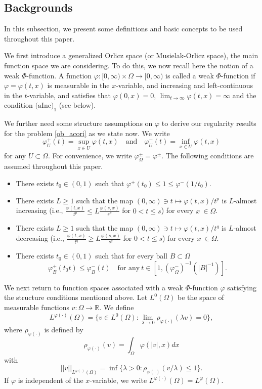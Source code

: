 \documentclass[11pt, reqno]{amsart}
\numberwithin{equation}{section}
\begin{document}
\subsection{Backgrounds}
In this subsection, we present some definitions and basic concepts to be used throughout this paper.

We first introduce a generalized Orlicz space (or Musielak-Orlicz space), the main function space we are considering.
To do this, we now recall here the notion of a weak $\Phi$-function.
A function $\varphi:[0, \infty) \times \Omega \to [0,\infty)$ is called a weak $\Phi$-function
if $\varphi=\varphi (t,x) $ is measurable in the $x$-variable, and increasing and left-continuous in the $t$-variable,
and satisfies that
$\varphi(0,x)=0$,
$\lim_{t \to \infty} \varphi (t,x)= \infty $
and the condition $\textrm{(aInc)}_{1}$ (see below).

We further need some structure assumptions on $\varphi$ to derive our regularity results for the problem \eqref{ob_acori} as we state now.
We write
$$\varphi_{U}^{+}(t)=\sup_{x\in U}\varphi(t,x) \quad \textrm{and} \quad \varphi_{U}^{-}(t)=\inf_{x\in U}\varphi(t,x) $$
for  any $U \subset \Omega$. For convenience, we write $ \varphi_{\Omega}^{\pm}=\varphi^{\pm}$.
The following conditions are assumed throughout this paper.
\begin{itemize}
\item[(A0)] There exists $t_{0} \in (0,1)$ such that $\varphi^{+}(t_{0}) \le 1 \le \varphi^{-}(1/t_{0})$.
\item[$\textrm{(aInc)}_{p}$] There exists $L \ge 1$ such that the map $(0,\infty) \ni t \mapsto \varphi (t,x)/ t^{p}$ is $L$-almost increasing  (i.e., $\frac{\varphi(t,x)}{t^p}\le L\frac{\varphi(s,x)}{s^p}$ for $0<t\le s$) for every $x\ \in \Omega$.
\item[$\textrm{(aDec)}_{q}$] There exists $L \ge 1$ such that the map $(0,\infty) \ni t \mapsto \varphi (t,x) / t^{q}$ is $L$-almost decreasing (i.e., $\frac{\varphi(t,x)}{t^q}\ge L\frac{\varphi(s,x)}{s^q}$ for $0<t\le s$) for every $x\ \in \Omega$.
\item[(A1-$\varphi^{-}$)] There exists $t_{0} \in (0,1)$ such that for every ball $B \subset \Omega$
$$\varphi_{B}^{+}(t_{0} t) \le \varphi_{B}^{-}(t)  \quad \textrm{for any} \ t \in [1, (\varphi_{\Omega}^{-})^{-1}(|B|^{-1})] .$$
\end{itemize}

We next return to function spaces associated with a weak $\Phi$-function $\varphi$ satisfying the structure conditions mentioned above.
Let $L^{0}(\Omega)$ be the space of measurable functions $v: \Omega \to \mathbb{R}$.
We define
$$L^{\varphi(\cdot)}(\Omega)=\{ v \in L^{0}(\Omega):  \lim_{\lambda \to 0} \rho_{\varphi(\cdot)}(\lambda v)=0  \}, $$
where $\rho_{\varphi(\cdot)}$ is defined by
$$\rho_{\varphi(\cdot)}( v)= \int_{\Omega}\varphi(|v|,x) dx$$
with
$$||v||_{L^{\varphi(\cdot)}(\Omega)}=\inf \{ \lambda >0: \rho_{\varphi(\cdot)}(v/\lambda ) \le 1 \} .$$
If $\varphi$ is independent of the $x$-variable, we write $L^{\varphi(\cdot)}(\Omega)=L^{\varphi}(\Omega)$.
\end{document}
